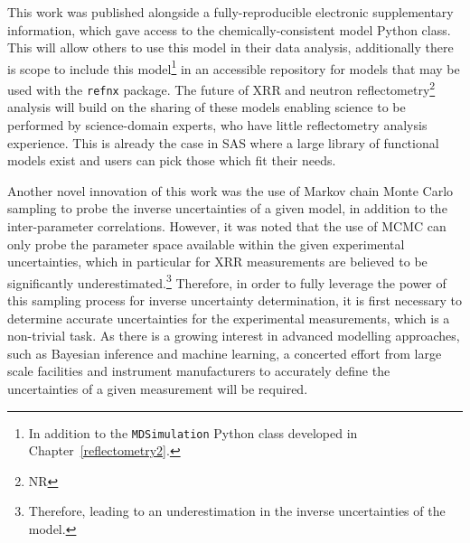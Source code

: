 This work was published alongside a fully-reproducible electronic supplementary information,\autocite{mccluskey_bayesian_2019,mccluskey_lipids_at_airdes_2019} which gave access to the chemically-consistent model Python class.
This will allow others to use this model in their data analysis, additionally there is scope to include this model\footnote{In addition to the \texttt{MDSimulation} Python class developed in Chapter~\ref{reflectometry2}.} in an accessible repository for models that may be used with the \texttt{refnx} package.\autocite{nelson_refnx_2019,nelson_refnx_2019-1,nelson_refnx-models_nodate}
The future of XRR and neutron reflectometry\footnote{NR} analysis will build on the sharing of these models enabling science to be performed by science-domain experts, who have little reflectometry analysis experience.
This is already the case in SAS where a large library of functional models exist and users can pick those which fit their needs.\autocite{noauthor_sasfit_nodate,noauthor_sasview_nodate}

Another novel innovation of this work was the use of Markov chain Monte Carlo sampling to probe the inverse uncertainties of a given model, in addition to the inter-parameter correlations.
However, it was noted that the use of MCMC can only probe the parameter space available within the given experimental uncertainties, which in particular for XRR measurements are believed to be significantly underestimated.\footnote{Therefore, leading to an underestimation in the inverse uncertainties of the model.}
Therefore, in order to fully leverage the power of this sampling process for inverse uncertainty determination, it is first necessary to determine accurate uncertainties for the experimental measurements, which is a non-trivial task.
As there is a growing interest in advanced modelling approaches, such as Bayesian inference and machine learning, a concerted effort from large scale facilities and instrument manufacturers to accurately define the uncertainties of a given measurement will be required.

